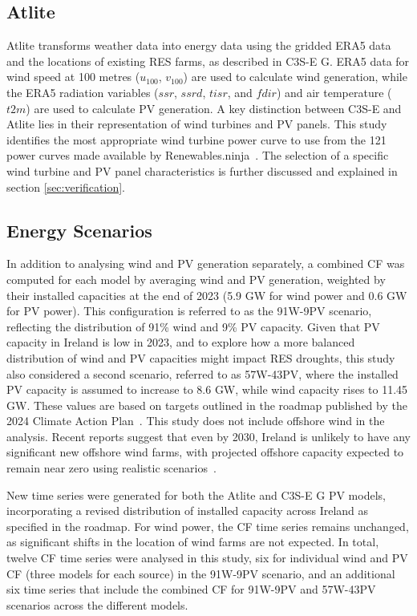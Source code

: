 \documentclass[preprint, 12pt]{elsarticle}
\begin{document}
\subsection{Atlite} 
\label{sec:atlite}

Atlite transforms weather data into energy data using the gridded ERA5 data and the locations of existing RES farms, as described in C3S-E G. ERA5 data for wind speed at 100 metres ($u_{100}$, $v_{100}$) are used to calculate wind generation, while the ERA5 radiation variables ($ssr$, $ssrd$, $tisr$, and $fdir$) and air temperature ($t2m$) are used to calculate PV generation. A key distinction between C3S-E and Atlite lies in their representation of wind turbines and PV panels. This study identifies the most appropriate wind turbine power curve to use from the 121 power curves made available by Renewables.ninja~\citep{staffell2016wake}. The selection of a specific wind turbine and PV panel characteristics is further discussed and explained in section \ref{sec:verification}.

\subsection{Energy Scenarios}
\label{sec:scenarios}

In addition to analysing wind and PV generation separately, a combined CF was computed for each model by averaging wind and PV generation, weighted by their installed capacities at the end of 2023 (5.9 GW for wind power and 0.6 GW for PV power). This configuration is referred to as the 91W-9PV scenario, reflecting the distribution of 91\% wind and 9\% PV capacity. Given that PV capacity in Ireland is low in 2023, and to explore how a more balanced distribution of wind and PV capacities might impact RES droughts, this study also considered a second scenario, referred to as 57W-43PV, where the installed PV capacity is assumed to increase to 8.6 GW, while wind capacity rises to 11.45 GW. These values are based on targets outlined in the roadmap published by the 2024 Climate Action Plan~\citep{cap2024future}. This study does not include offshore wind in the analysis. Recent reports suggest that even by 2030, Ireland is unlikely to have any significant new offshore wind farms, with projected offshore capacity expected to remain near zero using realistic scenarios~\citep{seai2024future}.

New time series were generated for both the Atlite and C3S-E G PV models, incorporating a revised distribution of installed capacity across Ireland as specified in the roadmap. For wind power, the CF time series remains unchanged, as significant shifts in the location of wind farms are not expected. In total, twelve CF time series were analysed in this study, six for individual wind and PV CF (three models for each source) in the 91W-9PV scenario, and an additional six time series that include the combined CF for 91W-9PV and 57W-43PV scenarios across the different models.
\end{document}
